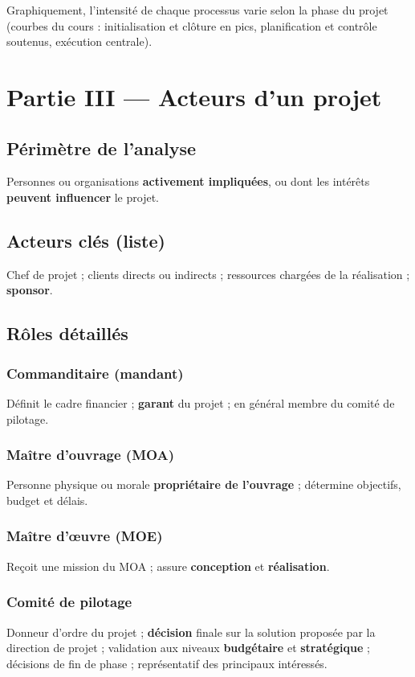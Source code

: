 \documentclass[11pt,a4paper]{article}
\begin{document}
Graphiquement, l'intensité de chaque processus varie selon la phase du projet (courbes du cours : initialisation et clôture en pics, planification et contrôle soutenus, exécution centrale).

\section{Partie III — Acteurs d'un projet}

\subsection{Périmètre de l'analyse}
Personnes ou organisations \textbf{activement impliquées}, ou dont les intérêts \textbf{peuvent influencer} le projet.

\subsection{Acteurs clés (liste)}
Chef de projet ; clients directs ou indirects ; ressources chargées de la réalisation ; \textbf{sponsor}.

\subsection{Rôles détaillés}

\subsubsection{Commanditaire (mandant)}
Définit le cadre financier ; \textbf{garant} du projet ; en général membre du comité de pilotage.

\subsubsection{Maître d'ouvrage (MOA)}
Personne physique ou morale \textbf{propriétaire de l'ouvrage} ; détermine objectifs, budget et délais.

\subsubsection{Maître d'\oe uvre (MOE)}
Reçoit une mission du MOA ; assure \textbf{conception} et \textbf{réalisation}.

\subsubsection{Comité de pilotage}
Donneur d'ordre du projet ; \textbf{décision} finale sur la solution proposée par la direction de projet ; validation aux niveaux \textbf{budgétaire} et \textbf{stratégique} ; décisions de fin de phase ; représentatif des principaux intéressés.
\end{document}
